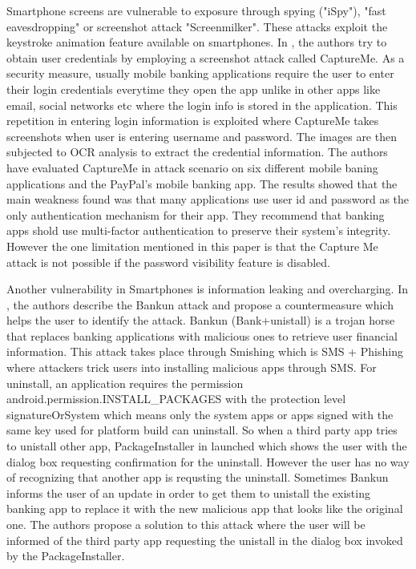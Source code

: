 \documentclass{mproj}
\begin{document}
Smartphone screens are vulnerable to exposure  through spying ("iSpy"), "fast eavesdropping" or screenshot attack "Screenmilker". These attacks exploit the keystroke animation feature available on smartphones. In \cite{el2015}, the authors try to obtain user credentials by employing a screenshot attack called CaptureMe. As a security measure, usually mobile banking applications require the user to enter their login credentials everytime they open the app unlike in other apps like email, social networks etc where the login info is stored in the application. This repetition in entering login information is exploited where CaptureMe takes screenshots when user is entering username and password. The images are then subjected to OCR analysis to extract the credential information. The authors have evaluated CaptureMe in attack scenario on six different mobile baning applications and the PayPal's mobile banking app. The results showed that the main weakness found was that many applications use user id and password as the only authentication mechanism for their app. They recommend that banking apps shold use multi-factor authentication to preserve their system's integrity. However the one limitation mentioned in this paper is that the Capture Me attack is not possible if the password visibility feature is disabled.

Another vulnerability in Smartphones is information leaking and overcharging. In \cite{stopbanukn}, the authors describe the Bankun attack and propose a countermeasure which helps the user to identify the attack. Bankun (Bank+unistall) is a trojan horse that replaces banking applications with malicious ones to retrieve user financial information. This attack takes place through Smishing which is SMS + Phishing where attackers trick users into installing malicious apps through SMS. For uninstall,  an application requires the permission android.permission.INSTALL\_PACKAGES with the protection level signatureOrSystem which means only the system apps or apps signed with the same key used for platform build can uninstall. So when a third party app tries to unistall other app, PackageInstaller in launched which shows the user with the dialog box requesting confirmation for the uninstall. However the user has no way of recognizing that another app is requsting the uninstall. Sometimes Bankun informs the user of an update in order to get them to unistall the existing banking app to replace it with the new malicious app that looks like the original one. The authors propose a solution to this attack where the user will be informed of the third party app requesting the unistall in the dialog box invoked by the PackageInstaller.
\end{document}
